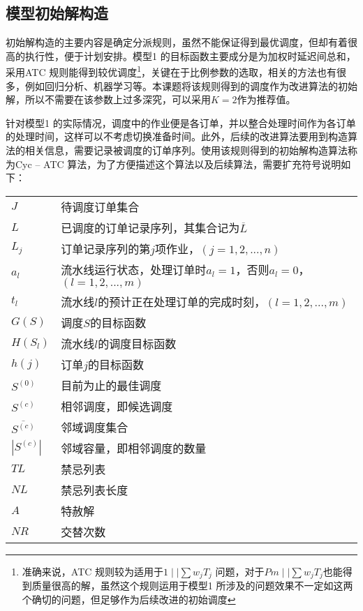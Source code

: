 \subsection{模型初始解构造}
初始解构造的主要内容是确定分派规则，虽然不能保证得到最优调度，但却有着很高的执行性，便于计划安排。模型1 的目标函数主要成分是为加权时延迟间总和，采用ATC 规则能得到较优调度\footnote{准确来说，ATC 规则较为适用于$1\mid\mid \sum w_jT_j$ 问题，对于$Pm\mid\mid \sum w_jT_j$也能得到质量很高的解，虽然这个规则运用于模型1 所涉及的问题效果不一定如这两个确切的问题，但足够作为后续改进的初始调度}，关键在于比例参数的选取，相关的方法也有很多，例如回归分析、机器学习等。本课题将该规则得到的调度作为改进算法的初始解，所以不需要在该参数上过多深究，可以采用$K = 2$作为推荐值\cite{bilge2007tabu}。

针对模型1 的实际情况，调度中的作业便是各订单，并以整合处理时间作为各订单的处理时间，这样可以不考虑切换准备时间。此外，后续的改进算法要用到构造算法的相关信息，需要记录被调度的订单序列。使用该规则得到的初始解构造算法称为Cyc -- ATC 算法，为了方便描述这个算法以及后续算法，需要扩充符号说明如下：

\begin{supertabular}{ll}
$J$ & 待调度订单集合\\
$L$ & 已调度的订单记录序列，其集合记为$\overline{L}$\\
$L_j$ & 订单记录序列的第$j$项作业，$(j = 1,2,...,n)$\\
$a_l$ & 流水线运行状态，处理订单时$a_l = 1$，否则$a_l = 0$，$(l = 1,2,...,m)$\\
$t_l$ & 流水线$l$的预计正在处理订单的完成时刻，$(l = 1,2,...,m)$\\
$G(S)$& 调度$S$的目标函数\\
$H(S_l)$ & 流水线$l$的调度目标函数\\
$h(j)$ & 订单$j$的目标函数\\
$S^{(0)}$ & 目前为止的最佳调度\\
$S^{(c)}$& 相邻调度，即候选调度\\
$\overline{S^{(c)}}$& 邻域调度集合\\
$|S^{(c)}|$& 邻域容量，即相邻调度的数量\\
$TL$ & 禁忌列表\\
$NL$ &禁忌列表长度\\
$A$ & 特赦解\\
$NR$ &交替次数\\[3pt]
\end{supertabular}


